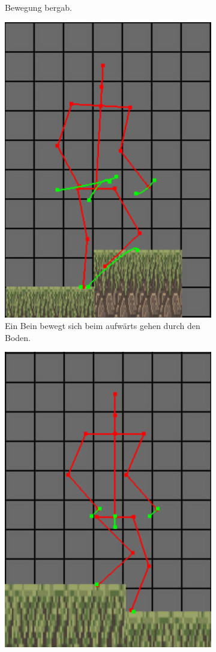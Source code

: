 \begin{figure}
\begin{subfigure}[t]{.4\linewidth}
        \caption{Bewegung bergab.}
        \label{downhill}
    \end{subfigure}
    \begin{subfigure}[t]{.4\linewidth}
        \centering
        \includegraphics[width=0.75\linewidth]{images/clip_through_gorund.png}
        \caption{Ein Bein bewegt sich beim aufwärts gehen durch den Boden.}
        \label{clip_through_ground}
    \end{subfigure}
    \begin{subfigure}[t]{.4\linewidth}
        \centering
        \includegraphics[width=0.75\linewidth]{images/standing_uneven.png}

\end{subfigure}
\end{figure}
